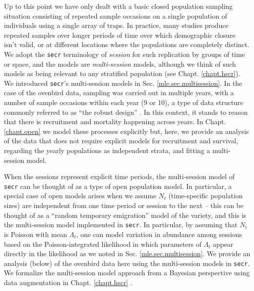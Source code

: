 Up to this point we have only dealt with a basic closed population
sampling situation consisting of repeated sample occasions on a single
population of individuals using a single array of traps. In practice,
many studies produce repeated samples over longer periods of time over
which demographic closure isn't valid, or at different locations where
the populations are completely distinct. We adopt the \mbox{\tt secr}
terminology of {\it session} for such replication by groups of time or
space, and the models are {\it multi-session} models, although we
think of such models as being relevant to any stratified population
(see Chapt. \ref{chapt.hscr}).  We introduced \mbox{\tt secr}'s
multi-session models in Sec. \ref{mle.sec.multisession}.  In the case
of the ovenbird data, sampling was carried out in multiple years, with
a number of sample occasions within each year (9 or 10), a type of
data structure commonly referred to as ``the robust design''
\citep{pollock:1982}.  In this context, it stands to reason that there
is recruitment and mortality happening across years. In
Chapt. \ref{chapt.open} we model these processes explicitly but, here,
we provide an analysis of the data that does not require explicit
models for recruitment and survival, regarding the yearly populations
as independent strata, and fitting a multi-session model.

When the sessions represent explicit time periods, the multi-session
model of \mbox{\tt secr} can be thought of as a type of open
population model.  In particular, a special case of open models arises
when we assume $N_{t}$ (time-specific population sizes) are
independent from one time period or session to the next -- this can be
thought of as a ``random temporary emigration'' model of the
\citet{kendall_etal:1997} variety, and this is the multi-session model
implemented in \mbox{\tt secr}.  In particular, by assuming that
$N_{t}$ is Poisson with mean $\Lambda_{t}$, one can model variation in
abundance among sessions based on the Poisson-integrated likelihood in
which parameters of $\Lambda_{t}$ appear directly in the likelihood as
we noted in Sec. \ref{mle.sec.multisession}.  We provide an analysis
(below) of the ovenbird data here using the multi-session models in
\mbox{\tt secr}.  We formalize the multi-session model approach from a
Bayesian perspective using data augmentation in
Chapt. \ref{chapt.hscr}
\citep{converse_royle:2012,royle_converse:2013}.

